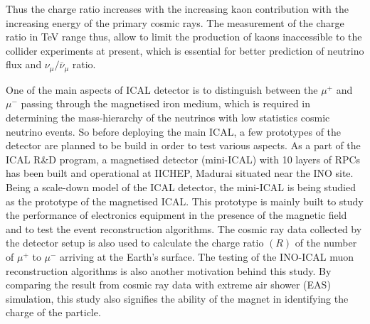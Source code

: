 Thus the charge ratio increases with the increasing kaon contribution
with the increasing energy of the primary cosmic rays.
The measurement of the charge ratio in TeV range thus, allow to limit
the production of kaons inaccessible to the collider experiments
at present, which is essential for better prediction of neutrino
flux and $\nu_{\mu}/\bar{\nu}_{\mu}$ ratio.

One of the main aspects of ICAL detector is to distinguish between
the $\mu^{+}$ and $\mu^{-}$ passing through the magnetised iron
medium, which is required in determining the mass-hierarchy of
the neutrinos with low statistics cosmic neutrino events.
So before deploying the main ICAL, a few prototypes
of the detector are planned to be build in order to test various
aspects.
As a part of the ICAL R\&D program, a magnetised detector (mini-ICAL)
with 10 layers of RPCs has been built and operational at IICHEP,
Madurai situated near the INO site. Being a scale-down model of the
ICAL detector, the mini-ICAL is being studied as the prototype of
the magnetised ICAL. This prototype is mainly built to study the
performance of electronics equipment in the presence of the magnetic
field and to test the event reconstruction algorithms.
The cosmic ray data collected by the
detector setup is also used to calculate the charge ratio $(R)$
of the number of $\mu^{+}$ to $\mu^{-}$ arriving at the Earth's surface.
The testing of the INO-ICAL muon reconstruction algorithms is also
another motivation behind this study.
By comparing the result from cosmic ray data with extreme
air shower (EAS) simulation, this study also signifies the ability of
the magnet in identifying the charge of the particle.

